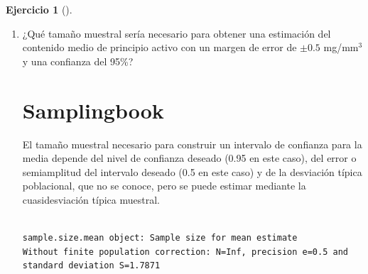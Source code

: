 \documentclass[
  a4paper,
]{scrreport}
\newenvironment{Shaded}{\begin{snugshade}}{\end{snugshade}}
\newcommand{\AttributeTok}[1]{\textcolor[rgb]{0.40,0.45,0.13}{#1}}
\newcommand{\FloatTok}[1]{\textcolor[rgb]{0.68,0.00,0.00}{#1}}
\newcommand{\FunctionTok}[1]{\textcolor[rgb]{0.28,0.35,0.67}{#1}}
\newcommand{\NormalTok}[1]{\textcolor[rgb]{0.00,0.23,0.31}{#1}}
\newcommand{\SpecialCharTok}[1]{\textcolor[rgb]{0.37,0.37,0.37}{#1}}
\theoremstyle{definition}
\newtheorem{exercise}{Ejercicio}[chapter]
\theoremstyle{remark}
\begin{document}
\begin{exercise}[]
\begin{enumerate}
\begin{tcolorbox}
  Como se ve, al aumentar el nivel de confianza del intervalo, la
  precisión disminuye. Ello es debido a que para tener más confianza de
  capturar el verdadero valor de la media en el intervalo, debemos hacer
  mayor el intervalo.

  \end{tcolorbox}
\item
  ¿Qué tamaño muestral sería necesario para obtener una estimación del
  contenido medio de principio activo con un margen de error de
  \(\pm 0.5\) mg/mm\(^3\) y una confianza del 95\%?

  \begin{tcolorbox}[enhanced jigsaw, colframe=quarto-callout-tip-color-frame, toprule=.15mm, bottomtitle=1mm, breakable, opacitybacktitle=0.6, toptitle=1mm, colback=white, bottomrule=.15mm, title=\textcolor{quarto-callout-tip-color}{\faLightbulb}\hspace{0.5em}{Solución}, arc=.35mm, left=2mm, titlerule=0mm, rightrule=.15mm, coltitle=black, leftrule=.75mm, opacityback=0, colbacktitle=quarto-callout-tip-color!10!white]

  \section{Samplingbook}

  El tamaño muestral necesario para construir un intervalo de confianza
  para la media depende del nivel de confianza deseado (0.95 en este
  caso), del error o semiamplitud del intervalo deseado (0.5 en este
  caso) y de la desviación típica poblacional, que no se conoce, pero se
  puede estimar mediante la cuasidesviación típica muestral.

\begin{Shaded}
\end{Shaded}

\begin{verbatim}

sample.size.mean object: Sample size for mean estimate
Without finite population correction: N=Inf, precision e=0.5 and standard deviation S=1.7871


\end{verbatim}
\end{tcolorbox}
\end{enumerate}
\end{exercise}
\end{document}
